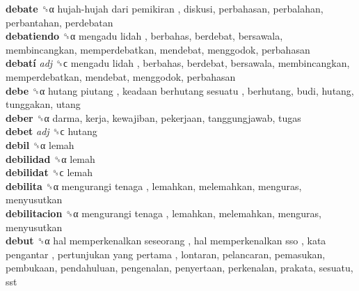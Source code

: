 \textbf{debate} ␝α   hujah-hujah dari pemikiran , diskusi, perbahasan, perbalahan, perbantahan, perdebatan  \\
\textbf{debatiendo} ␝α   mengadu lidah , berbahas, berdebat, bersawala, membincangkan, memperdebatkan, mendebat, menggodok, perbahasan  \\
\textbf{debatí} \emph{adj}  ␝ϲ   mengadu lidah , berbahas, berdebat, bersawala, membincangkan, memperdebatkan, mendebat, menggodok, perbahasan  \\
\textbf{debe} ␝α   hutang piutang ,  keadaan berhutang sesuatu , berhutang, budi, hutang, tunggakan, utang  \\
\textbf{deber} ␝α  darma, kerja, kewajiban, pekerjaan, tanggungjawab, tugas  \\
\textbf{debet} \emph{adj}  ␝ϲ  hutang  \\
\textbf{debil} ␝α  lemah  \\
\textbf{debilidad} ␝α  lemah  \\
\textbf{debilidat} ␝ϲ  lemah  \\
\textbf{debilita} ␝α   mengurangi tenaga , lemahkan, melemahkan, menguras, menyusutkan  \\
\textbf{debilitacion} ␝α   mengurangi tenaga , lemahkan, melemahkan, menguras, menyusutkan  \\
\textbf{debut} ␝α   hal memperkenalkan seseorang ,  hal memperkenalkan sso ,  kata pengantar ,  pertunjukan yang pertama , lontaran, pelancaran, pemasukan, pembukaan, pendahuluan, pengenalan, penyertaan, perkenalan, prakata, sesuatu, sst  \\
